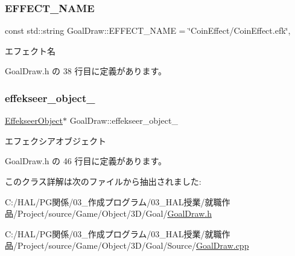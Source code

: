 \subsubsection{\texorpdfstring{E\+F\+F\+E\+C\+T\+\_\+\+N\+A\+ME}{EFFECT\_NAME}}
{\footnotesize\ttfamily const std\+::string Goal\+Draw\+::\+E\+F\+F\+E\+C\+T\+\_\+\+N\+A\+ME = \char`\"{}Coin\+Effect/Coin\+Effect.\+efk\char`\"{}\hspace{0.3cm}{\ttfamily [static]}, {\ttfamily [private]}}



エフェクト名 



 Goal\+Draw.\+h の 38 行目に定義があります。

\mbox{\label{class_goal_draw_a2d4449f780f6b6fd6dd3e8763fc67b2d}} 
\subsubsection{\texorpdfstring{effekseer\+\_\+object\+\_\+}{effekseer\_object\_}}
{\footnotesize\ttfamily \mbox{\hyperlink{class_effekseer_object}{Effekseer\+Object}}$\ast$ Goal\+Draw\+::effekseer\+\_\+object\+\_\+\hspace{0.3cm}{\ttfamily [private]}}



エフェクシアオブジェクト 



 Goal\+Draw.\+h の 46 行目に定義があります。



このクラス詳解は次のファイルから抽出されました\+:\begin{DoxyCompactItemize}
\item 
C\+:/\+H\+A\+L/\+P\+G関係/03\+\_\+作成プログラム/03\+\_\+\+H\+A\+L授業/就職作品/\+Project/source/\+Game/\+Object/3\+D/\+Goal/\mbox{\hyperlink{_goal_draw_8h}{Goal\+Draw.\+h}}\item 
C\+:/\+H\+A\+L/\+P\+G関係/03\+\_\+作成プログラム/03\+\_\+\+H\+A\+L授業/就職作品/\+Project/source/\+Game/\+Object/3\+D/\+Goal/\+Source/\mbox{\hyperlink{_goal_draw_8cpp}{Goal\+Draw.\+cpp}}\end{DoxyCompactItemize}
